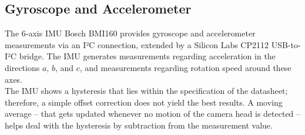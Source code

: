 \subsection{Gyroscope and Accelerometer}
\label{sec:GyroPosition}
The 6-axis IMU Bosch BMI160 provides gyroscope and accelerometer measurements via an I²C connection, extended by a Silicon Labs CP2112 USB-to-I²C bridge. The IMU generates measurements regarding acceleration in the directions $a$, $b$, and $c$, and measurements regarding rotation speed around these axes.\\
The IMU shows a hysteresis that lies within the specification of the datasheet; therefore, a simple offset correction does not yield the best results. A moving average – that gets updated whenever no motion of the camera head is detected – helps deal with the hysteresis by subtraction from the measurement value.
